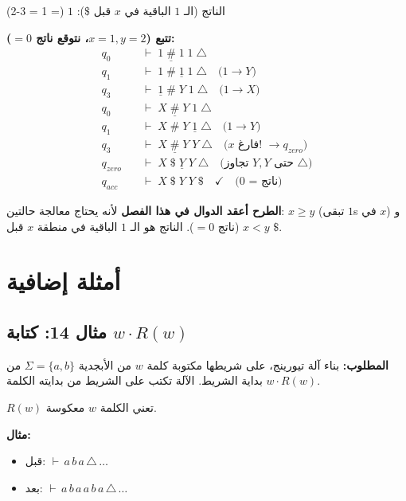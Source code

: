 \documentclass[14pt]{extarticle}
\begin{document}
الناتج (الـ $1$ الباقية في $x$ قبل $\$$): $1$ (= 1 = 3-2) \checkmark

\textbf{تتبع ($x=1, y=2$، نتوقع ناتج $= 0$):}
\begin{align*}
q_0 \quad &\vdash \; 1 \; \underline{\#} \; 1 \; 1 \; \triangle \\
q_1 \quad &\vdash \; 1 \; \# \; \underline{1} \; 1 \; \triangle \quad \text{($1 \to Y$)} \\
q_3 \quad &\vdash \; \underline{1} \; \# \; Y \; 1 \; \triangle \quad \text{($1 \to X$)} \\
q_0 \quad &\vdash \; X \; \underline{\#} \; Y \; 1 \; \triangle \\
q_1 \quad &\vdash \; X \; \# \; Y \; \underline{1} \; \triangle \quad \text{($1 \to Y$)} \\
q_3 \quad &\vdash \; X \; \underline{\#} \; Y \; Y \; \triangle \quad \text{($x$ فارغ! $\to q_{zero}$)} \\
q_{zero} \quad &\vdash \; X \; \$ \; \underline{Y} \; Y \; \triangle \quad \text{(تجاوز $Y,Y$ حتى $\triangle$)} \\
q_{acc} \quad &\vdash \; X \; \$ \; Y \; Y \; \$ \quad \checkmark \quad \text{(ناتج = 0)}
\end{align*}

\begin{boxNote}
\textbf{الطرح أعقد الدوال في هذا الفصل} لأنه يحتاج معالجة حالتين: $x \geq y$ (تبقى $1$s في $x$) و $x < y$ (ناتج $= 0$). الناتج هو الـ $1$ الباقية في منطقة $x$ قبل $\$$.
\end{boxNote}

\clearpage

\section{أمثلة إضافية}

\subsection{مثال 14: كتابة $w \cdot R(w)$}

\textbf{المطلوب:} بناء آلة تيورينج، على شريطها مكتوبة كلمة $w$ من الأبجدية $\Sigma = \{a, b\}$ من بداية الشريط. الآلة تكتب على الشريط من بدايته الكلمة $w \cdot R(w)$.

$R(w)$ تعني الكلمة $w$ معكوسة.

\textbf{مثال:}
\begin{itemize}
    \item قبل: $\vdash \, a \, b \, a \, \triangle \, \ldots$
    \item بعد: $\vdash \, a \, b \, a \, a \, b \, a \, \triangle \, \ldots$
\end{itemize}
\end{document}
